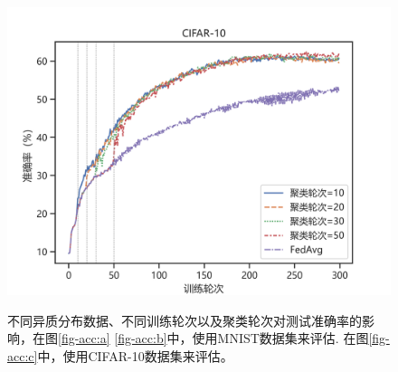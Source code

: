 \begin{figure}[htb]
{		%
			\centering
			\label{fig-acc:d}
			\includegraphics[width=0.45\columnwidth]{figs/cifar-noniid-win-2}
	}
	\caption[方案准确率评估]{不同异质分布数据、不同训练轮次以及聚类轮次对测试准确率的影响，在图\ref{fig-acc:a} \ref{fig-acc:b}中，使用MNIST数据集来评估. 在图\ref{fig-acc:c}中，使用CIFAR-10数据集来评估。}
	\label{fig-acc}
\end{figure}

